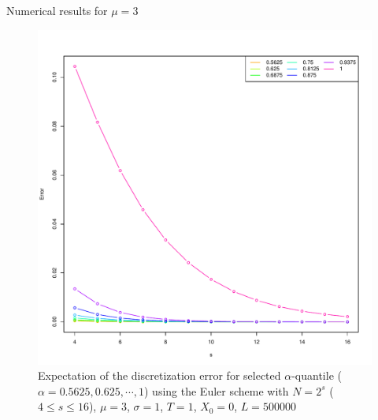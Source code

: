 \documentclass[cjk,10pt]{beamer}
\begin{document}
\begin{frame}{Numerical results for $\mu=3$}
\begin{figure}[p]
   \centering
   \includegraphics[scale=0.3]{nout_4_25_3.pdf} %
   \caption{Expectation of the discretization error for selected $\alpha$-quantile ($\alpha = 0.5625, 0.625,  \cdots, 1$) using the Euler scheme with $N = 2^s$ ($4\le s \le 16$), $\mu=3$, $\sigma=1$, $T=1$, $X_0=0$, $L=500000$ }
   \label{f:err3}
\end{figure}
\end{frame}
\end{document}
